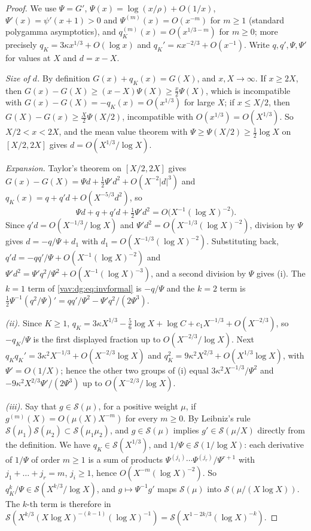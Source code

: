 \documentclass[11pt]{article}
\theoremstyle{remark}\newtheorem{remark}[theorem]{Remark}
\begin{document}
\begin{proof}
We use $\Psi=G'$, $\Psi(x)=\log(x/\rho)+O(1/x)$, $\Psi'(x)=\psi'(x+1)>0$
and $\Psi^{(m)}(x)=O(x^{-m})$ for $m\ge1$ (standard polygamma asymptotics),
and $q_K^{(m)}(x)=O(x^{1/3-m})$ for $m\ge0$; more precisely
$q_K=3\kappa x^{1/3}+O(\log x)$ and $q_K'=\kappa x^{-2/3}+O(x^{-1})$.
Write $q,q',\Psi,\Psi'$ for values at $X$ and $d=x-X$.

\emph{Size of $d$.} By definition $G(x)+q_K(x)=G(X)$, and $x,X\to\infty$.
If $x\ge2X$, then $G(x)-G(X)\ge(x-X)\Psi(X)\ge\tfrac x2\Psi(X)$, which is
incompatible with $G(x)-G(X)=-q_K(x)=O(x^{1/3})$ for large $X$; if
$x\le X/2$, then $G(X)-G(x)\ge\tfrac X2\Psi(X/2)$, incompatible with
$O(x^{1/3})=O(X^{1/3})$. So $X/2<x<2X$, and the mean value theorem with
$\Psi\ge\Psi(X/2)\ge\tfrac12\log X$ on $[X/2,2X]$ gives
$d=O(X^{1/3}/\log X)$.

\emph{Expansion.} Taylor's theorem on $[X/2,2X]$ gives
$G(x)-G(X)=\Psi d+\tfrac12\Psi'd^2+O(X^{-2}|d|^3)$ and
$q_K(x)=q+q'd+O(X^{-5/3}d^2)$, so
\[
 \Psi d+q+q'd+\tfrac12\Psi'd^2=O\bigl(X^{-1}(\log X)^{-2}\bigr).
\]
Since $q'd=O(X^{-1/3}/\log X)$ and $\Psi'd^2=O(X^{-1/3}(\log X)^{-2})$,
division by $\Psi$ gives $d=-q/\Psi+d_1$ with
$d_1=O(X^{-1/3}(\log X)^{-2})$. Substituting back,
$q'd=-qq'/\Psi+O(X^{-1}(\log X)^{-2})$ and
$\Psi'd^2=\Psi'q^2/\Psi^2+O(X^{-1}(\log X)^{-3})$, and a second division
by $\Psi$ gives (i). The $k=1$ term of \eqref{vav:dg:eq:invformal} is
$-q/\Psi$ and the $k=2$ term is
$\tfrac12\Psi^{-1}(q^2/\Psi)'=qq'/\Psi^2-\Psi'q^2/(2\Psi^3)$.

\emph{(ii).} Since $K\ge1$,
$q_K=3\kappa X^{1/3}-\tfrac56\log X+\log C+c_1X^{-1/3}+O(X^{-2/3})$, so
$-q_K/\Psi$ is the first displayed fraction up to $O(X^{-2/3}/\log X)$.
Next $q_Kq_K'=3\kappa^2X^{-1/3}+O(X^{-2/3}\log X)$ and
$q_K^2=9\kappa^2X^{2/3}+O(X^{1/3}\log X)$, with $\Psi'=O(1/X)$; hence the
other two groups of (i) equal $3\kappa^2X^{-1/3}/\Psi^2$ and
$-9\kappa^2X^{2/3}\Psi'/(2\Psi^3)$ up to $O(X^{-2/3}/\log X)$.

\emph{(iii).} Say that $g\in\mathcal S(\mu)$, for a positive weight $\mu$,
if $g^{(m)}(X)=O(\mu(X)X^{-m})$ for every $m\ge0$. By Leibniz's rule
$\mathcal S(\mu_1)\mathcal S(\mu_2)\subset\mathcal S(\mu_1\mu_2)$, and
$g\in\mathcal S(\mu)$ implies $g'\in\mathcal S(\mu/X)$ directly from the
definition. We have $q_K\in\mathcal S(X^{1/3})$,
and $1/\Psi\in\mathcal S(1/\log X)$: each derivative of $1/\Psi$ of order
$m\ge1$ is a sum of products $\Psi^{(j_1)}\cdots\Psi^{(j_r)}/\Psi^{r+1}$
with $j_1+\dots+j_r=m$, $j_i\ge1$, hence $O(X^{-m}(\log X)^{-2})$. So
$q_K^k/\Psi\in\mathcal S(X^{k/3}/\log X)$, and $g\mapsto\Psi^{-1}g'$ maps
$\mathcal S(\mu)$ into $\mathcal S(\mu/(X\log X))$. The $k$-th term is
therefore in $\mathcal S(X^{k/3}(X\log X)^{-(k-1)}(\log X)^{-1})
=\mathcal S(X^{1-2k/3}(\log X)^{-k})$.


\end{proof}
\end{document}
